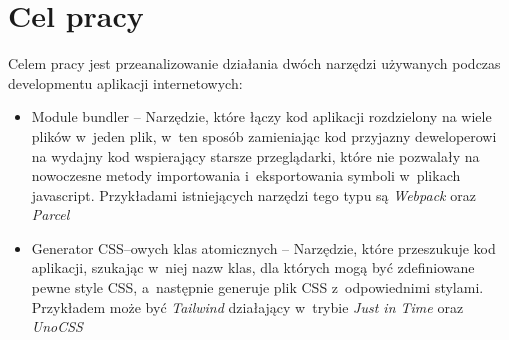 \documentclass{SGGW-thesis}
\begin{document}
\section{Cel pracy}
Celem pracy jest przeanalizowanie działania dwóch narzędzi używanych podczas developmentu aplikacji internetowych:
\begin{itemize}
    \item Module bundler -- Narzędzie, które łączy kod aplikacji rozdzielony na wiele plików w~jeden plik, w~ten sposób zamieniając kod przyjazny deweloperowi na wydajny kod wspierający starsze przeglądarki, które nie pozwalały na nowoczesne metody importowania i~eksportowania symboli w~plikach javascript. Przykładami istniejących narzędzi tego typu są \emph{Webpack} oraz \emph{Parcel}
    \item Generator CSS--owych klas atomicznych -- Narzędzie, które przeszukuje kod aplikacji, szukając w~niej nazw klas, dla których mogą być zdefiniowane pewne style CSS, a~następnie generuje plik CSS z~odpowiednimi stylami. Przykładem może być \emph{Tailwind\cite{Tailwind_jit}} działający w~trybie \emph{Just in Time} oraz \emph{UnoCSS\cite{unocss}}
\end{itemize}
\end{document}
